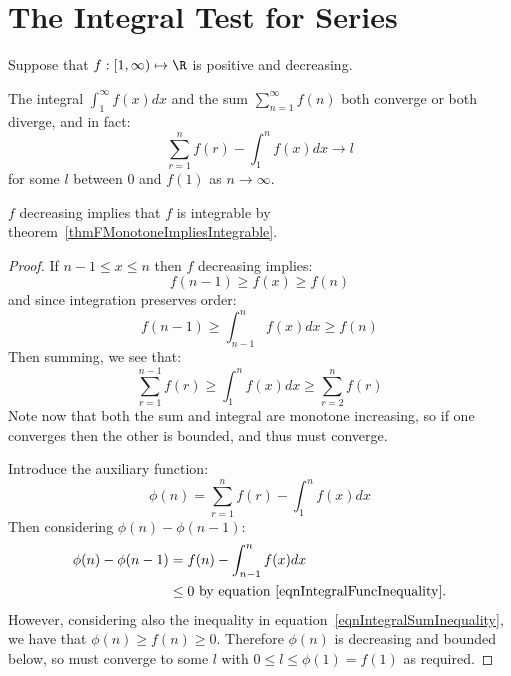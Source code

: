 \documentclass[../Main.tex]{subfiles}
\begin{document}
\section{The Integral Test for Series}
\begin{theorem}
    Suppose that $f : [1, \infty) \mapsto \R$ is positive and decreasing.
    
    The integral $\int_1^\infty f(x) dx$ and the sum $\sum_{n = 1}^\infty f(n)$ both converge or both diverge, and in fact:
    \begin{equation*}
        \sum_{r = 1}^n f(r) - \int_1^n f(x) dx \to l
    \end{equation*}
    for some $l$ between $0$ and $f(1)$ as $n \to \infty$.
    \label{thmIntegralTest}
\end{theorem}
\begin{remark}
    $f$ decreasing implies that $f$ is integrable by theorem~\ref{thmFMonotoneImpliesIntegrable}.
\end{remark}
\begin{proof}
    If $n-1 \leq x \leq n$ then $f$ decreasing implies:
    \begin{equation*}
        f(n-1) \geq f(x) \geq f(n)
    \end{equation*}
    and since integration preserves order:
    \begin{equation}
        f(n-1) \geq \int_{n-1}^n f(x) dx \geq f(n)
        \label{eqnIntegralFuncInequality}
    \end{equation}
    Then summing, we see that:
    \begin{equation}
        \sum_{r = 1}^{n-1}f(r) \geq \int_1^n f(x) dx \geq \sum_{r = 2}^n f(r)
        \label{eqnIntegralSumInequality}
    \end{equation}
    Note now that both the sum and integral are monotone increasing, so if one converges then the other is bounded, and thus must converge.

    Introduce the auxiliary function:
    \begin{equation*}
        \phi(n) = \sum_{r = 1}^n f(r) - \int_1^n f(x) dx
    \end{equation*}
    Then considering $\phi(n) - \phi(n-1)$:
    \begin{align*}
        \phi(n) - \phi(n-1) &= f(n) - \int_{n - 1}^n f(x) dx \\
        &\leq 0 \text{ by equation~\ref{eqnIntegralFuncInequality}.}
    \end{align*}
    However, considering also the inequality in equation~\ref{eqnIntegralSumInequality}, we have that $\phi(n) \geq f(n) \geq 0$. Therefore $\phi(n)$ is decreasing and bounded below, so must converge to some $l$ with $0 \leq l \leq \phi(1) = f(1)$ as required.
\end{proof}
\end{document}
